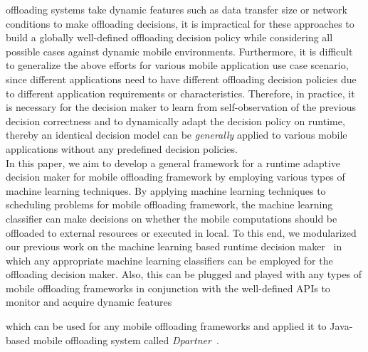 \documentclass[10pt, conference, compsocconf]{IEEEtran}
\begin{document}
offloading systems take dynamic features such as data transfer size or
network conditions to make offloading decisions, it is impractical for
these approaches to build a globally well-defined offloading decision
policy while considering all possible cases against dynamic mobile
environments.
%
Furthermore, it is difficult to generalize the above efforts for various
mobile application use case scenario, since different applications need
to have different offloading decision policies due to different
application requirements or characteristics.
%
Therefore, in practice, it is necessary for the decision maker to learn
from self-observation of the previous decision correctness and to
dynamically adapt the decision policy on runtime, thereby an identical
decision model can be \textit{generally} applied to various mobile
applications without any predefined decision policies.\\
%
\indent In this paper, we aim to develop a general framework for a
runtime adaptive decision maker for mobile offloading framework by
employing various types of machine learning techniques.
%
By applying machine learning techniques to scheduling problems
for mobile offloading framework, the machine learning classifier can
make decisions on whether the mobile computations should be offloaded to
external resources or executed in local.
%
To this end, we modularized our previous work on the machine learning
based runtime decision maker~\cite{ml} in which any appropriate machine
learning classifiers can be employed for the offloading decision maker.
%
Also, this can be plugged and played with any types of mobile offloading
frameworks in conjunction with the well-defined APIs to monitor and
acquire dynamic features 


which can be used for any mobile
offloading frameworks
and applied it to Java-based mobile
offloading system called \textit{Dpartner}~\cite{dpartner}.
%
\end{document}
